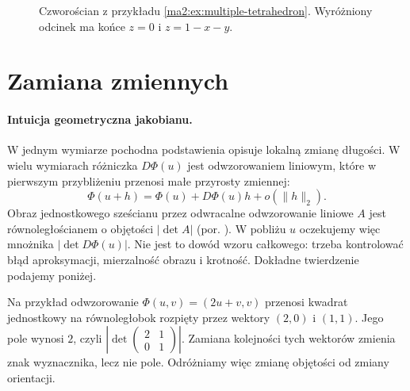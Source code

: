 \begin{figure}[htbp]
\centering
{}
\caption{Czworościan z przykładu
\ref{ma2:ex:multiple-tetrahedron}. Wyróżniony odcinek
ma końce $z=0$ i $z=1-x-y$.}
\label{ma2:fig:multiple-tetrahedron}
\end{figure}

\section{Zamiana zmiennych}

\paragraph{Intuicja geometryczna jakobianu.}
W jednym wymiarze pochodna podstawienia
opisuje lokalną zmianę długości.
W wielu wymiarach różniczka
$D\Phi(u)$ jest odwzorowaniem liniowym,
które w pierwszym przybliżeniu
przenosi małe przyrosty zmiennej:
\[
 \Phi(u+h)=\Phi(u)+D\Phi(u)h+o(\|h\|_2).
\]
Obraz jednostkowego sześcianu przez
odwracalne odwzorowanie liniowe $A$
jest równoległościanem o objętości
$|\det A|$ (por.
).
W pobliżu $u$ oczekujemy więc
mnożnika $|\det D\Phi(u)|$.
Nie jest to dowód wzoru całkowego:
trzeba kontrolować błąd aproksymacji,
mierzalność obrazu i krotność.
Dokładne twierdzenie podajemy poniżej.

Na przykład odwzorowanie
$\Phi(u,v)=(2u+v,v)$ przenosi kwadrat
jednostkowy na równoległobok rozpięty
przez wektory $(2,0)$ i $(1,1)$.
Jego pole wynosi $2$, czyli
$\left|\det\begin{pmatrix}2&1\\0&1\end{pmatrix}\right|$.
Zamiana kolejności tych wektorów
zmienia znak wyznacznika, lecz nie pole.
Odróżniamy więc zmianę objętości
od zmiany orientacji.

